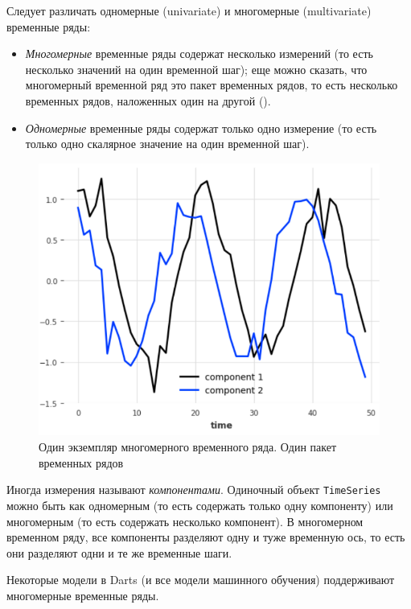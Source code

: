 \documentclass[%
	11pt,
	a4paper,
	utf8,
		]{article}
\begin{document}
Следует различать одномерные (univariate) и многомерные (multivariate) временные ряды:
\begin{itemize}
	\item \emph{Многомерные} временные ряды содержат несколько измерений (то есть несколько значений на один временной шаг); еще можно сказать, что многомерный временной ряд это пакет временных рядов, то есть несколько временных рядов, наложенных один на другой ().
	
	\item \emph{Одномерные} временные ряды содержат только одно измерение (то есть только одно скалярное значение на один временной шаг).
\end{itemize}

\begin{figure}[h]
	\centering
	\includegraphics[scale=0.8]{figures/multivar.png}
	\caption{ Один экземпляр многомерного временного ряда. Один пакет временных рядов }\label{fig:multivar}
\end{figure}

Иногда измерения называют \emph{компонентами}. Одиночный объект \verb|TimeSeries| можно быть как одномерным (то есть содержать только одну компоненту) или многомерным (то есть содержать несколько компонент). В многомерном временном ряду, все компоненты разделяют одну и туже временную ось, то есть они разделяют одни и те же временные шаги.

Некоторые модели в Darts (и все модели машинного обучения) поддерживают многомерные временные ряды. 
\end{document}
